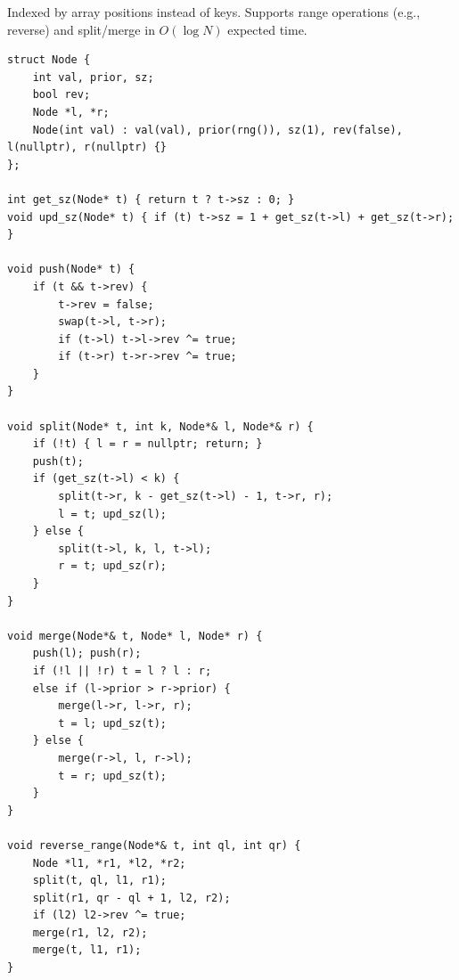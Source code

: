 
Indexed by array positions instead of keys. Supports range operations (e.g., reverse) and split/merge in $O(\log N)$ expected time.

\begin{lstlisting}
struct Node {
    int val, prior, sz;
    bool rev;
    Node *l, *r;
    Node(int val) : val(val), prior(rng()), sz(1), rev(false), l(nullptr), r(nullptr) {}
};

int get_sz(Node* t) { return t ? t->sz : 0; }
void upd_sz(Node* t) { if (t) t->sz = 1 + get_sz(t->l) + get_sz(t->r); }

void push(Node* t) {
    if (t && t->rev) {
        t->rev = false;
        swap(t->l, t->r);
        if (t->l) t->l->rev ^= true;
        if (t->r) t->r->rev ^= true;
    }
}

void split(Node* t, int k, Node*& l, Node*& r) {
    if (!t) { l = r = nullptr; return; }
    push(t);
    if (get_sz(t->l) < k) {
        split(t->r, k - get_sz(t->l) - 1, t->r, r);
        l = t; upd_sz(l);
    } else {
        split(t->l, k, l, t->l);
        r = t; upd_sz(r);
    }
}

void merge(Node*& t, Node* l, Node* r) {
    push(l); push(r);
    if (!l || !r) t = l ? l : r;
    else if (l->prior > r->prior) {
        merge(l->r, l->r, r);
        t = l; upd_sz(t);
    } else {
        merge(r->l, l, r->l);
        t = r; upd_sz(t);
    }
}

void reverse_range(Node*& t, int ql, int qr) {
    Node *l1, *r1, *l2, *r2;
    split(t, ql, l1, r1);
    split(r1, qr - ql + 1, l2, r2);
    if (l2) l2->rev ^= true;
    merge(r1, l2, r2);
    merge(t, l1, r1);
}
\end{lstlisting}

